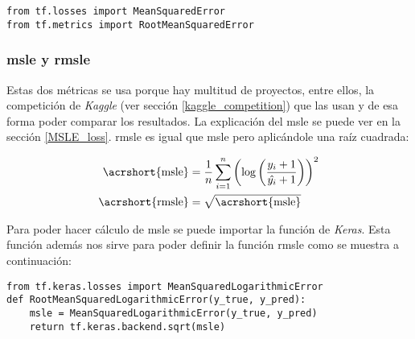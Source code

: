 \begin{verbatim}
from tf.losses import MeanSquaredError
from tf.metrics import RootMeanSquaredError
\end{verbatim}

\subsubsection{\acrshort{msle} y \acrshort{rmsle}}

Estas dos métricas se usa porque hay multitud de proyectos, entre ellos, la competición de \textit{Kaggle} (ver sección \ref{kaggle_competition}) que las usan y de esa forma poder comparar los resultados. La explicación del \acrshort{msle} se puede ver en la sección \ref{MSLE_loss}. \acrshort{rmsle} es igual que \acrshort{msle} pero aplicándole una raíz cuadrada:

\begin{equation}
\centering
    \begin{split}
        \text{\acrshort{msle}} &= \frac{1}{n} \sum_{i=1}^n \left(\log{\left(\frac{y_i + 1}{\hat{y_i} + 1}\right)}\right)^2 \\
        \text{\acrshort{rmsle}} &= \sqrt{\text{\acrshort{msle}}}
    \end{split}
\end{equation}

Para poder hacer cálculo de \acrshort{msle} se puede importar la función de \textit{Keras}. Esta función además nos sirve para poder definir la función \acrshort{rmsle} como se muestra a continuación:

\begin{verbatim}
from tf.keras.losses import MeanSquaredLogarithmicError
def RootMeanSquaredLogarithmicError(y_true, y_pred):
    msle = MeanSquaredLogarithmicError(y_true, y_pred)
    return tf.keras.backend.sqrt(msle)
\end{verbatim}